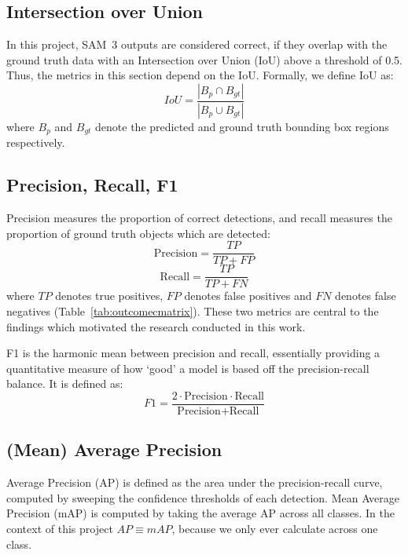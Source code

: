 \documentclass[author={Jacob Stephenson},
    degree={BSc},
    title={Robust Great Ape Species Detection in Wild Camera Trap Imagery with Promptable Concept Segmentation},
    unit={COMS30045},
    subtitle={}]{dissertation}
\begin{document}
\subsection{Intersection over Union}

In this project, SAM~3 outputs are considered correct, if they overlap with the ground truth data with an Intersection over Union (IoU) above a threshold of 0.5. Thus, the metrics in this section depend on the IoU. Formally, we define IoU as:
\begin{equation}
    IoU = \frac{|B_p \cap B_{gt}|}{|B_p \cup B_{gt}|}
\end{equation}
where $B_p$ and $B_{gt}$ denote the predicted and ground truth bounding box regions respectively.


\subsection{Precision, Recall, F1}

Precision measures the proportion of correct detections, and recall measures the proportion of ground truth objects which are detected:
\begin{equation}
    \text{Precision} = \frac{TP}{TP + FP}
    \label{eq:precision}
\end{equation}
\begin{equation}
    \text{Recall} = \frac{TP}{TP + FN}
    \label{eq:recall}
\end{equation}
where $TP$ denotes true positives, $FP$ denotes false positives and $FN$ denotes false negatives (Table~\ref{tab:outcomecmatrix}).
These two metrics are central to the findings which motivated the research conducted in this work.

F1 is the harmonic mean between precision and recall, essentially providing a quantitative measure of how `good' a model is based off the precision-recall balance. It is defined as:
\begin{equation}
    F1 = \frac{2 \cdot \text{Precision} \cdot \text{Recall}}{\text{Precision} + \text{Recall}}
\end{equation}

\subsection{(Mean) Average Precision}

Average Precision (AP) is defined as the area under the precision-recall curve, computed by sweeping the confidence thresholds of each detection.
Mean Average Precision (mAP) is computed by taking the average AP across all classes. In the context of this project $AP \equiv mAP$, because we only ever calculate across one class.
\end{document}
